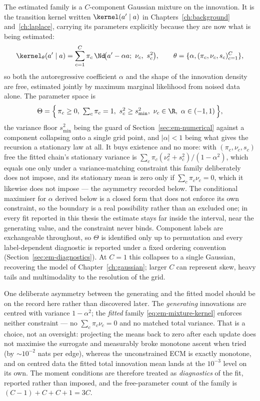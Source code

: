 The estimated family is a $C$-component Gaussian mixture on the innovation. It
is the transition kernel written $\kernel(a' \mid a)$ in
Chapters~\ref{ch:background} and~\ref{ch:laplace}, carrying its parameters
explicitly because they are now what is being estimated:
\begin{equation}
  \kernel_\theta(a' \mid a) = \sum_{c=1}^{C} \pi_c \,
    \Nd\!\big(a' - \alpha a;\ \nu_c,\ s_c^2\big),
  \qquad \theta = \{\alpha, (\pi_c,\nu_c,s_c)_{c=1}^C\},
  \label{eq:em-mixture-kernel}
\end{equation}
so both the autoregressive coefficient $\alpha$ and the shape of the innovation
density are free, estimated jointly by maximum marginal likelihood from noised
data alone. The parameter space is
\begin{equation}
  \Theta = \Big\{\, \pi_c \geq 0,\ \textstyle\sum_c \pi_c = 1,\
    s_c^2 \geq s_{\min}^2,\ \nu_c \in \R,\
    \alpha \in (-1, 1) \,\Big\},
  \label{eq:em-parameter-space}
\end{equation}
the variance floor $s_{\min}^2$ being the guard of
Section~\ref{sec:em-numerical} against a component collapsing onto a single
grid point, and $|\alpha| < 1$ being what gives the recursion a stationary law
at all. It buys existence and no more: with $(\pi_c, \nu_c, s_c)$ free the
fitted chain's stationary variance is
$\sum_c \pi_c(\nu_c^2 + s_c^2)/(1-\alpha^2)$, which equals one only under a
variance-matching constraint this family deliberately does not impose, and its
stationary mean is zero only if $\sum_c \pi_c \nu_c = 0$, which it likewise
does not impose --- the asymmetry recorded below. The conditional maximiser for
$\alpha$ derived below is a closed form that does not enforce its own
constraint, so the boundary is a real possibility rather than an excluded one;
in every fit reported in this thesis the estimate stays far inside the
interval, near the generating value, and the constraint never binds. Component
labels are exchangeable throughout, so $\Theta$ is identified only up to
permutation and every label-dependent diagnostic is reported under a fixed
ordering convention (Section~\ref{sec:em-diagnostics}). At $C=1$ this collapses to a single Gaussian, recovering the model
of Chapter~\ref{ch:gaussian}; larger $C$ can represent skew, heavy tails and
multimodality to the resolution of the grid.

One deliberate asymmetry between the generating and the fitted model should be
on the record here rather than discovered later. The \emph{generating}
innovations are centred with variance $1-\alpha^2$; the \emph{fitted} family
\eqref{eq:em-mixture-kernel} enforces neither constraint --- no
$\sum_c \pi_c\nu_c = 0$ and no matched total variance. That is a choice, not
an oversight: projecting the means back to zero after each update does not
maximise the surrogate and measurably broke monotone ascent when tried
(by $\sim 10^{-2}$ nats per edge), whereas the unconstrained ECM is exactly
monotone, and on centred data the fitted total innovation mean lands at the
$10^{-3}$ level on its own. The moment conditions are therefore treated as
\emph{diagnostics} of the fit, reported rather than imposed, and the
free-parameter count of the family is $(C-1) + C + C + 1 = 3C$. 


